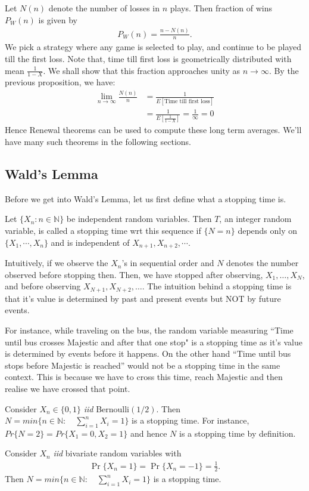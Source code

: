 \documentclass[a4paper,10pt, english]{article}
\begin{document}
Let $N(n)$ denote the number of losses in $n$ plays. Then fraction of wins $P_W(n)$ is given by 
\begin{align*}
P_W(n) = \frac{n-N(n)}{n}.
\end{align*}
We pick a strategy where any game is selected to play, and continue to be played till the first loss. Note that, time till first loss is geometrically distributed with mean $\frac{1}{1-X}$. We shall show that this fraction approaches unity as $n \to \infty$. By the previous proposition, we have:
\begin{align*}
\lim_{n \to \infty} \frac{N(n)}{n} &= \frac{1}{E[\mbox{Time till first loss}]} \\
&= \frac{1}{E\left[\frac{1}{1-X}\right]} = \frac{1}{\infty} = 0
\end{align*}
Hence Renewal theorems can be used to compute these long term averages. We'll have many such theorems in the following sections.

\subsection{Wald's Lemma}
Before we get into Wald's Lemma, let us first define what a stopping time is.
\begin{defn}
	Let $\{X_n: n\in \mathbb{N}\}$ be independent random variables. Then $T$, an integer random variable, is called a stopping time wrt this sequence if $\{N=n\}$ depends only on $\{X_1,\cdots,X_n\}$ and is independent of $X_{n+1}, X_{n+2},\cdots$. 
\end{defn}
Intuitively, if we observe the $X_n$'s in sequential order and $N$ denotes the number observed before stopping then. Then, we have stopped after observing, $X_1, \ldots, X_N$, and before observing $X_{N+1}, X_{N+2}, \ldots$. 
The intuition behind a stopping time is that it's value is determined by past and present events but NOT by future events. 
\begin{exmp}
	For instance, while traveling on the bus, the random variable measuring ``Time until bus crosses Majestic and after that one stop" is a stopping time as it's value is determined by events before it happens. On the other hand ``Time until bus stops before Majestic is reached'' would not be a stopping time  in the same context. This is because we have to cross this time, reach Majestic and then realise we have crossed that point. 
\end{exmp}
\begin{exmp} Consider $X_n \in \{0,1\}$ \emph{iid} Bernoulli$(1/2)$. Then $N = min \{n \in \mathbb{N}:\quad \sum_{i=1}^n X_i = 1\}$ is a stopping time. For instance, $Pr\{N=2\} = Pr\{X_1=0,X_2=1\}$ and hence $ N $ is a stopping time by definition.
\end{exmp}
\begin{exmp} Consider $X_n$ \emph{iid} bivariate random variables with 
	\begin{align*}
	\Pr\{X_n = 1\} = \Pr\{X_n = -1\} = \frac{1}{2}. 
	\end{align*}
	Then $N = min \{n \in \mathbb{N}:\quad \sum_{i=1}^n X_i = 1\}$ is a stopping time.
\end{exmp}
\end{document}
